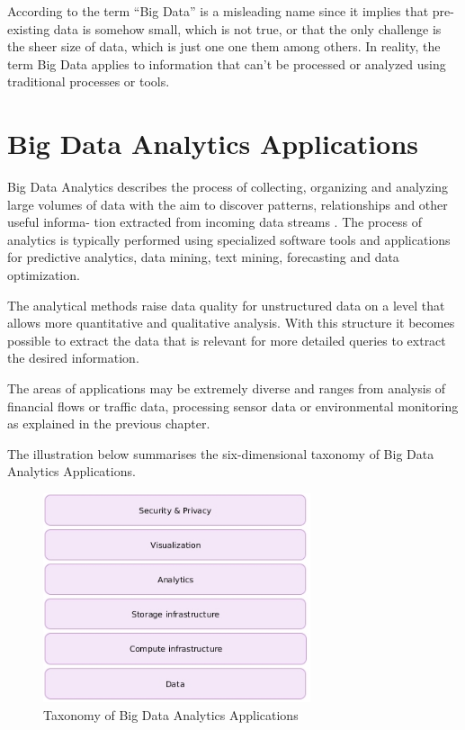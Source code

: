 According to \cite{Marz15} the term “Big Data” is a misleading name since it implies that
pre-existing data is somehow small, which is not true, or that the only challenge is the
sheer size of data, which is just one one them among others. In reality, the term Big Data
applies to information that can’t be processed or analyzed using traditional processes or
tools.

\section{Big Data Analytics Applications}
Big Data Analytics describes the process of collecting, organizing and analyzing large
volumes of data with the aim to discover patterns, relationships and other useful informa-
tion extracted from incoming data streams \cite{Marz15}. The process of analytics is typically
performed using specialized software tools and applications for predictive analytics, data
mining, text mining, forecasting and data optimization.

The analytical methods raise data quality for unstructured data on a level that allows
more quantitative and qualitative analysis. With this structure it becomes possible
to extract the data that is relevant for more detailed queries to extract the desired information.

The areas of applications may be extremely diverse and ranges from analysis of financial
flows or traffic data, processing sensor data or environmental monitoring as explained in
the previous chapter.

The illustration below summarises the six-dimensional taxonomy \cite{Bitk14, Csa14} of Big
Data Analytics Applications.
\begin{figure}[H]
	\centering
	\includegraphics[width=0.7\textwidth]{../images/05-big-data-taxonomy.jpg}
	\caption{Taxonomy of Big Data Analytics Applications \cite{Bitk14, Csa14}}
	\label{taxonomy-bigdata-applications}
\end{figure}

